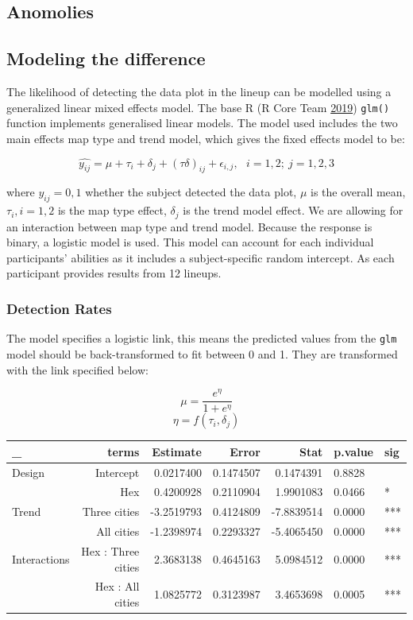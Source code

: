 \documentclass[conference,final,]{IEEEtran}
\begin{document}
\hypertarget{anomolies}{%
\subsection{Anomolies}\label{anomolies}}

\hypertarget{modeling-the-difference}{%
\subsection{Modeling the difference}\label{modeling-the-difference}}

The likelihood of detecting the data plot in the lineup can be modelled
using a generalized linear mixed effects model. The base R (R Core Team
\protect\hyperlink{ref-RCore}{2019}) \texttt{glm()} function implements
generalised linear models. The model used includes the two main effects
map type and trend model, which gives the fixed effects model to be:

\[\widehat{y_{ij}} = \mu + \tau_i + \delta_j + (\tau\delta)_{ij} + \epsilon_{i,j}, ~~~ i=1,2; ~j=1,2,3\]

where \(y_{ij} = 0, 1\) whether the subject detected the data plot,
\(\mu\) is the overall mean, \(\tau_i, i=1,2\) is the map type effect,
\(\delta_j\) is the trend model effect. We are allowing for an
interaction between map type and trend model. Because the response is
binary, a logistic model is used. This model can account for each
individual participants' abilities as it includes a subject-specific
random intercept. As each participant provides results from 12 lineups.

\hypertarget{detection-rates}{%
\subsubsection{Detection Rates}\label{detection-rates}}

The model specifies a logistic link, this means the predicted values
from the \texttt{glm} model should be back-transformed to fit between 0
and 1. They are transformed with the link specified below:

\[\mu = \frac{e^{\eta}}{1 + e^{\eta}}\] \[\eta = f(\tau_i,\delta_j)\]

\begin{tabular}{l|r|r|r|r|l|l}
\hline
\_ & terms & Estimate & Error & Stat & p.value & sig\\
\hline
Design & Intercept & 0.0217400 & 0.1474507 & 0.1474391 & 0.8828 & \\
\hline
 & Hex & 0.4200928 & 0.2110904 & 1.9901083 & 0.0466 & *\\
\hline
Trend & Three cities & -3.2519793 & 0.4124809 & -7.8839514 & 0.0000 & ***\\
\hline
 & All cities & -1.2398974 & 0.2293327 & -5.4065450 & 0.0000 & ***\\
\hline
Interactions & Hex : Three cities & 2.3683138 & 0.4645163 & 5.0984512 & 0.0000 & ***\\
\hline
 & Hex : All cities & 1.0825772 & 0.3123987 & 3.4653698 & 0.0005 & ***\\
\hline
\end{tabular}
\end{document}
